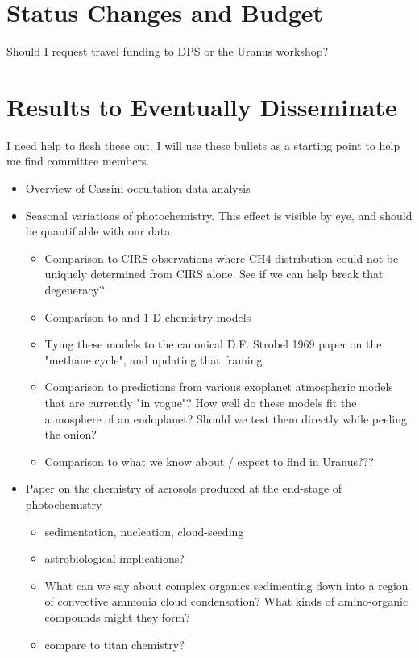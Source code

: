 \documentclass[12pt]{article}
\begin{document}
\section{Status Changes and Budget}

Should I request travel funding to DPS or the Uranus workshop?

\section{Results to Eventually Disseminate}

I need help to flesh these out. I will use these bullets as a starting point to
help me find committee members.

\begin{itemize}
  \item Overview of Cassini occultation data analysis
  \item Seasonal variations of photochemistry. This effect is visible by eye, and should be quantifiable with our data.
  \begin{itemize}
     \item Comparison to \citep{Fletcher10} CIRS observations where CH4 distribution could not be uniquely determined from CIRS alone. See if we can help break that degeneracy?
     \item Comparison to \citep{Moses05} and \citep{Fouchet09} 1-D chemistry models
     \item Tying these models to the canonical D.F. Strobel 1969 paper on the
      "methane cycle", and updating that framing
     \item Comparison to predictions from various exoplanet atmospheric models that
      are currently "in vogue"? How well do these models fit the atmosphere of
      an endoplanet? Should we test them directly while peeling the onion?
     \item Comparison to what we know about / expect to find in Uranus???
  \end{itemize}
  \item Paper on the chemistry of aerosols produced at the end-stage of photochemistry
  \begin{itemize}
     \item sedimentation, nucleation, cloud-seeding \citep{Fletcher18}
     \item astrobiological implications?
     \item What can we say about complex organics sedimenting down into a region of
      convective ammonia cloud condensation? What kinds of amino-organic
      compounds might they form?
     \item compare to titan chemistry?
  \end{itemize}
\end{itemize}
\end{document}
